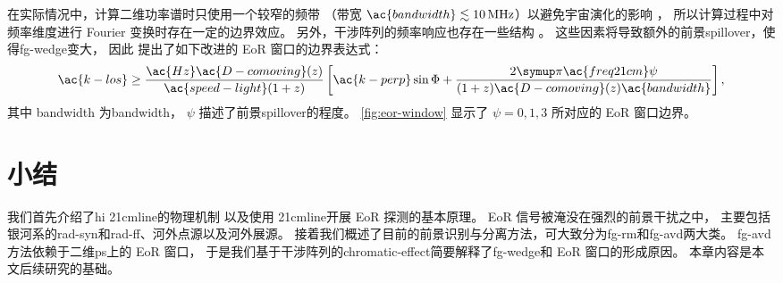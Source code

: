 在实际情况中，计算二维功率谱时只使用一个较窄的频带
（带宽 $\ac{bandwidth} \lesssim \SI{10}{\MHz}$）以避免宇宙演化的影响
\cite{wyithe2004,thyagarajan2013}，
所以计算过程中对频率维度进行 Fourier 变换时存在一定的边界效应。
另外，干涉阵列的频率响应也存在一些结构 \cite{deLeraAcedo2017,trott2017}。
这些因素将导致额外的前景\ac{spillover}，使得\ac{fg-wedge}变大，
因此  提出了如下改进的 EoR 窗口的边界表达式：
\begin{equation}
  \label{eq:eor-window}
  \ac{k-los} \ge
    \frac{\ac{Hz} \ac{D-comoving}(z)}{\ac{speed-light} (1+z)}
    \left[ \ac{k-perp} \sin\Phi
      + \frac{2\Cpi\ac{freq21cm} \psi}{(1+z) \ac{D-comoving}(z)
        \ac{bandwidth}} \right] ,
\end{equation}
其中 \ac{bandwidth} 为\acl{bandwidth}，
$\psi$ 描述了前景\ac{spillover}的程度。
\autoref{fig:eor-window} 显示了 $\psi = 0, 1, 3$ 所对应的 EoR 窗口边界。


\section{小结}

我们首先介绍了\ac{hi} \ac{21cmline}的物理机制
以及使用 \ac{21cmline}开展 EoR 探测的基本原理。
EoR 信号被淹没在强烈的前景干扰之中，
主要包括银河系的\ac{rad-syn}和\ac{rad-ff}、河外点源以及河外展源。
接着我们概述了目前的前景识别与分离方法，可大致分为\ac{fg-rm}和\ac{fg-avd}两大类。
\ac{fg-avd}方法依赖于二维\ac{ps}上的 EoR 窗口，
于是我们基于干涉阵列的\ac{chromatic-effect}简要解释了\ac{fg-wedge}和
EoR 窗口的形成原因。
本章内容是本文后续研究的基础。


